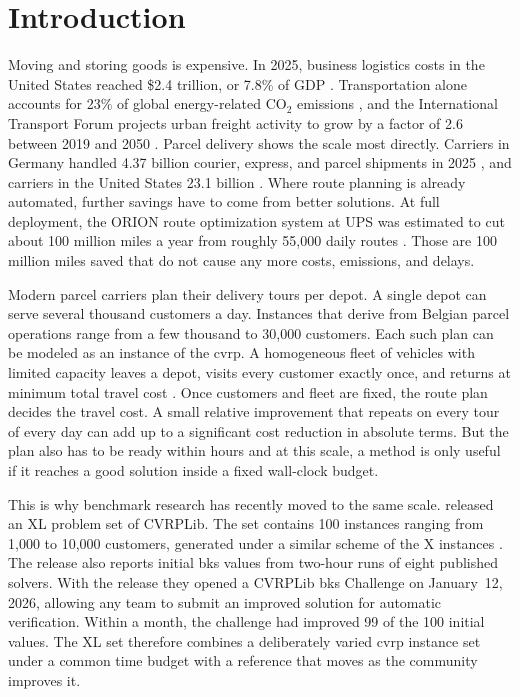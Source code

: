 \chapter{Introduction}\label{chapter:introduction}

\renewcommand{\thepage}{\arabic{page}}

\setcounter{page}{1}

Moving and storing goods is expensive.
In 2025, business logistics costs in the United States reached \$2.4 trillion, or 7.8\% of GDP \citep{cscmpStateOfLogistics2026}.
Transportation alone accounts for 23\% of global energy-related CO$_2$ emissions \citep[p.~46]{itfTransportOutlook2023}, and the International Transport Forum projects urban freight activity to grow by a factor of 2.6 between 2019 and 2050 \citep[p.~91]{itfTransportOutlook2023}. Parcel delivery shows
the scale most directly. Carriers in Germany handled 4.37 billion courier, express, and parcel shipments in 2025 \citep{bpexKEPStudie2026}, and carriers in the United States 23.1 billion \citep[p.~3]{pitneyBowesParcelShippingIndex2026}. Where route planning is already automated, further savings have to come from better solutions. At full deployment, the ORION route optimization system at UPS was estimated to cut about 100 million miles a year from roughly 55,000 daily routes \citep[pp.~8, 19]{hollandUPSOptimizesDelivery2017}. Those are 100 million miles saved that do not cause any more costs, emissions, and delays. 

Modern parcel carriers plan their delivery tours per depot. A single depot can serve several thousand customers a day. Instances that \citet{efficiently_arnold_2019} derive from Belgian parcel operations range from a few thousand to 30{,}000 customers.
Each such plan can be modeled as an instance of the \gls{cvrp}. A homogeneous fleet of vehicles with limited capacity leaves a depot, visits every customer exactly once, and returns at minimum total travel cost \citep[p.~3]{tothVehicleRouting2014}.
Once customers and fleet are fixed, the route plan decides the travel cost. A small relative improvement that repeats on every tour of every day can add up to a significant cost reduction in absolute terms. But the plan also has to be ready within hours and at this scale, a method is only useful if it reaches a good solution inside a fixed wall-clock budget.

This is why benchmark research has recently moved to the same scale.
\citet{queirogaXLInstancesCapacitated2026} released an XL problem set of CVRPLib. The set contains 100 instances ranging from 1{,}000 to 10{,}000 customers, generated under a similar scheme of the X instances \citep{uchoaNewBenchmarkInstances2017}. The release also reports initial \gls{bks} values from two-hour runs of eight published solvers.
With the release they opened a CVRPLib \gls{bks} Challenge on January~12, 2026, allowing any team to submit an improved solution for automatic verification. Within a month, the challenge had improved 99 of the 100 initial values.
The XL set therefore combines a deliberately varied \gls{cvrp} instance set under a common time budget with a reference that moves as the community improves it.

